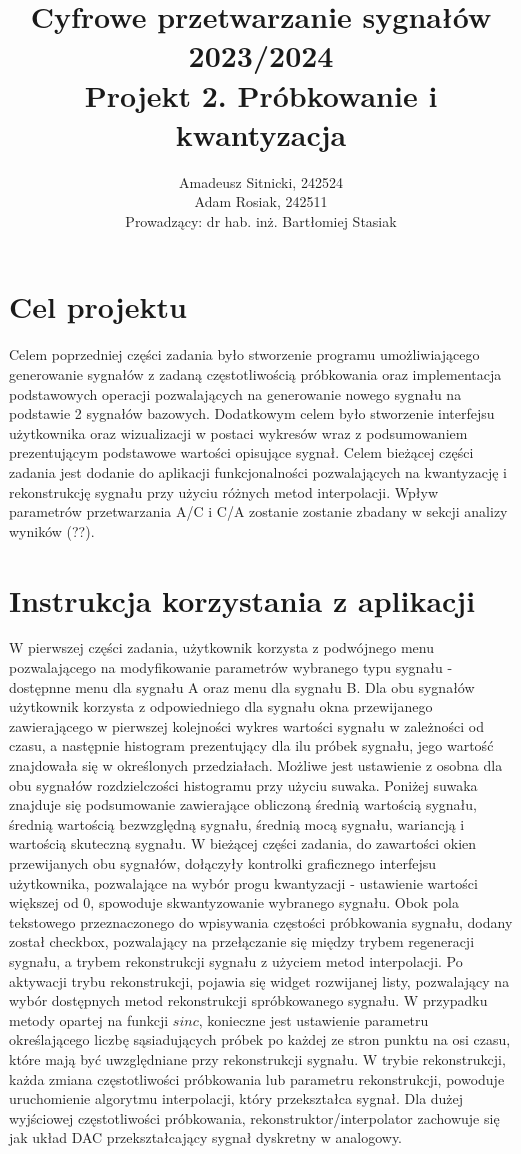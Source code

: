 \documentclass{article}
\author{
	{Amadeusz Sitnicki, 242524} \\
	{Adam Rosiak, 242511}\\
{Prowadzący: dr hab. inż. Bartłomiej Stasiak}
}
\title{Cyfrowe przetwarzanie sygnałów 2023/2024\\Projekt 2. Próbkowanie i kwantyzacja}
\begin{document}
\maketitle
\section{Cel projektu}
\indent\indent Celem poprzedniej części zadania było stworzenie programu umożliwiającego generowanie sygnałów z zadaną częstotliwością próbkowania oraz implementacja podstawowych operacji pozwalających na generowanie nowego sygnału na podstawie 2 sygnałów bazowych. Dodatkowym celem było stworzenie interfejsu użytkownika oraz wizualizacji w postaci wykresów wraz z podsumowaniem prezentującym podstawowe wartości opisujące sygnał.
\newline
\indent Celem bieżącej części zadania jest dodanie do aplikacji funkcjonalności pozwalających na kwantyzację i rekonstrukcję sygnału przy użyciu różnych metod interpolacji. Wpływ parametrów przetwarzania A/C i C/A zostanie zostanie zbadany w sekcji analizy wyników (??). 

\section{Instrukcja korzystania z aplikacji}
\indent\indent W pierwszej części zadania, użytkownik korzysta z podwójnego menu pozwalającego na modyfikowanie parametrów wybranego typu sygnału - dostępnne menu dla sygnału A oraz menu dla sygnału B. Dla obu sygnałów użytkownik korzysta z odpowiedniego dla sygnału okna przewijanego zawierającego w pierwszej kolejności wykres wartości sygnału w zależności od czasu, a następnie histogram prezentujący dla ilu próbek sygnału, jego wartość znajdowała się w określonych przedziałach. Możliwe jest ustawienie z osobna dla obu sygnałów rozdzielczości histogramu przy użyciu suwaka. Poniżej suwaka znajduje się podsumowanie zawierające obliczoną średnią wartością sygnału, średnią wartością bezwzględną sygnału, średnią mocą sygnału, wariancją i wartością skuteczną sygnału. 
\newline
\indent W bieżącej części zadania, do zawartości okien przewijanych obu sygnałów, dołączyły kontrolki graficznego interfejsu użytkownika, pozwalające na wybór progu kwantyzacji - ustawienie wartości większej od 0, spowoduje skwantyzowanie wybranego sygnału. Obok pola tekstowego przeznaczonego do wpisywania częstości próbkowania sygnału, dodany został checkbox, pozwalający na przełączanie się między trybem regeneracji sygnału, a trybem rekonstrukcji sygnału z użyciem metod interpolacji. Po aktywacji trybu rekonstrukcji, pojawia się widget rozwijanej listy, pozwalający na wybór dostępnych metod rekonstrukcji spróbkowanego sygnału. W przypadku metody opartej na funkcji $sinc$, konieczne jest ustawienie parametru określającego liczbę sąsiadujących próbek po każdej ze stron punktu na osi czasu, które mają być uwzględniane przy rekonstrukcji sygnału. W trybie rekonstrukcji, każda zmiana częstotliwości próbkowania lub parametru rekonstrukcji, powoduje uruchomienie algorytmu interpolacji, który przekształca sygnał. Dla dużej wyjściowej częstotliwości próbkowania, rekonstruktor/interpolator zachowuje się jak układ DAC przekształcający sygnał dyskretny w analogowy.   
\end{document}
